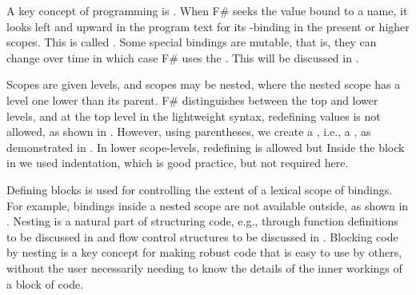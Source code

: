 \documentclass[fsharpNotes.tex]{subfiles}
\begin{document}
A key concept of programming is . When F\# seeks the value bound to a name, it looks left and upward in the program text for its -binding in the present or higher scopes.
This is called .
Some special bindings are mutable, that is, they can change over time in which case F\# uses the . This will be discussed in .

Scopes are given levels, and scopes may be nested, where the nested scope has a level one lower than its parent. F\# distinguishes between the top and lower levels, and at the top level in the lightweight syntax, redefining values is not allowed, as shown in .
%
%
However, using parentheses, we create a , i.e., a , as demonstrated in .
%
%
In lower scope-levels, redefining is allowed but  Inside the block in  we used indentation, which is good practice, but not required here.

Defining blocks is used for controlling the extent of a lexical scope of bindings. For example, bindings inside a nested scope are not available outside, as shown in .
%
%
Nesting is a natural part of structuring code, e.g., through function definitions to be discussed in  and flow control structures to be discussed in . Blocking code by nesting is a key concept for making robust code that is easy to use by others, without the user necessarily needing to know the details of the inner workings of a block of code.
\end{document}
